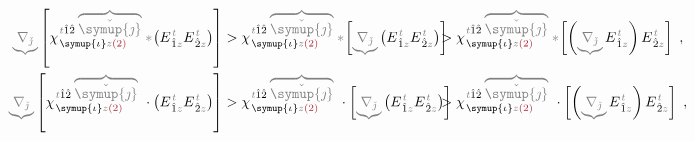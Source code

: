 \begin{subequations}
\begin{align}
	\mathcolor{gray}{\underbrace{\nabla_{\check{\jmath}}}} \left[ \chi^{\;\! \mathcolor{gray}{t} \hat{1} \hat{2} \;\! \mathcolor{gray}{\overbrace{\check{\symup{\jmath}}}}}_{\;\! \symup{\iota} \mathcolor{gray}{z} \textcolor{Maroon}{(2)}} \mathcolor{gray}{*}\! \left( E^{\;\!\mathcolor{gray}{t}}_{\;\! \hat{1} \mathcolor{gray}{z}} E^{\;\!\mathcolor{gray}{t}}_{\;\! \hat{2} \mathcolor{gray}{z}} \right) \right] &> \chi^{\;\! \mathcolor{gray}{t} \hat{1} \hat{2} \;\! \mathcolor{gray}{\overbrace{\check{\symup{\jmath}}}}}_{\;\! \symup{\iota} \mathcolor{gray}{z} \textcolor{Maroon}{(2)}} \mathcolor{gray}{*}\! \left[ \mathcolor{gray}{\underbrace{\nabla_{\check{\jmath}}}} \left( E^{\;\!\mathcolor{gray}{t}}_{\;\! \hat{1} \mathcolor{gray}{z}} E^{\;\!\mathcolor{gray}{t}}_{\;\! \hat{2} \mathcolor{gray}{z}} \right) \right] \hspace{-2em}&&> \chi^{\;\! \mathcolor{gray}{t} \hat{1} \hat{2} \;\! \mathcolor{gray}{\overbrace{\check{\symup{\jmath}}}}}_{\;\! \symup{\iota} \mathcolor{gray}{z} \textcolor{Maroon}{(2)}} \mathcolor{gray}{*}\! \left[ \left( \mathcolor{gray}{\underbrace{\nabla_{\check{\jmath}}}} E^{\;\!\mathcolor{gray}{t}}_{\;\! \hat{1} \mathcolor{gray}{z}} \right) E^{\;\!\mathcolor{gray}{t}}_{\;\! \hat{2} \mathcolor{gray}{z}} \right]~, \label{eq:Volterra-space} \\
	\mathcolor{gray}{\underbrace{\nabla_{\check{\jmath}}}} \left[ \chi^{\;\! \mathcolor{gray}{t} \hat{1} \hat{2} \;\! \mathcolor{gray}{\overbrace{\check{\symup{\jmath}}}}}_{\;\! \symup{\iota} \mathcolor{gray}{z} \textcolor{Maroon}{(2)}} ~\cdot \left( E^{\;\!\mathcolor{gray}{t}}_{\;\! \hat{1} \mathcolor{gray}{z}} E^{\;\!\mathcolor{gray}{t}}_{\;\! \hat{2} \mathcolor{gray}{z}} \right) \right] &> \chi^{\;\! \mathcolor{gray}{t} \hat{1} \hat{2} \;\! \mathcolor{gray}{\overbrace{\check{\symup{\jmath}}}}}_{\;\! \symup{\iota} \mathcolor{gray}{z} \textcolor{Maroon}{(2)}} ~\cdot \left[ \mathcolor{gray}{\underbrace{\nabla_{\check{\jmath}}}} \left( E^{\;\!\mathcolor{gray}{t}}_{\;\! \hat{1} \mathcolor{gray}{z}} E^{\;\!\mathcolor{gray}{t}}_{\;\! \hat{2} \mathcolor{gray}{z}} \right) \right] \hspace{-2em}&&> \chi^{\;\! \mathcolor{gray}{t} \hat{1} \hat{2} \;\! \mathcolor{gray}{\overbrace{\check{\symup{\jmath}}}}}_{\;\! \symup{\iota} \mathcolor{gray}{z} \textcolor{Maroon}{(2)}} ~\cdot \left[ \left( \mathcolor{gray}{\underbrace{\nabla_{\check{\jmath}}}} E^{\;\!\mathcolor{gray}{t}}_{\;\! \hat{1} \mathcolor{gray}{z}} \right) E^{\;\!\mathcolor{gray}{t}}_{\;\! \hat{2} \mathcolor{gray}{z}} \right]~, \label{eq:Volterra-space+time}
\end{align}
\end{subequations}
